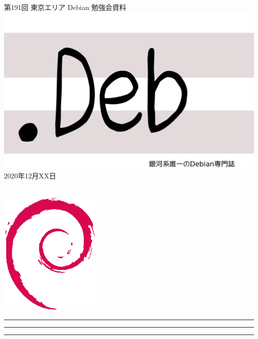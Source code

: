 \documentclass[mingoth,a4paper]{jsarticle}
\newcommand{\debmtgyear}{2020}
\newcommand{\debmtgmonth}{12}
\newcommand{\debmtgdate}{XX}
\newcommand{\debmtgnumber}{191}
\begin{document}
\begin{titlepage}
\thispagestyle{empty}

\vspace*{-2cm}
第\debmtgnumber{}回 東京エリア Debian 勉強会資料\\
\hspace*{-2cm}
\includegraphics{image-assets/dotdeb.pdf}\\
\hfill{}\debmtgyear{}年\debmtgmonth{}月\debmtgdate{}日

\\

\vspace*{-2cm}
\hfill{}\includegraphics[height=6cm]{image-assets/openlogo-nd.eps}
\end{titlepage}

\newpage

\begin{minipage}[b]{0.2\hsize}
 \colorbox{titleback}{}
\end{minipage}
\begin{minipage}[b]{0.8\hsize}
\hrule
\vspace{2mm}
\hrule
\begin{multicols}{2}
\tableofcontents
\end{multicols}
\vspace{2mm}
\hrule
\end{minipage}
\end{document}
